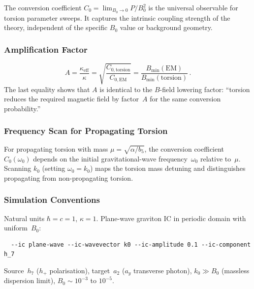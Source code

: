 The conversion coefficient $C_0 = \lim_{B_0 \to 0} P/B_0^2$ is the
universal observable for torsion parameter sweeps.  It captures the
intrinsic coupling strength of the theory, independent of the specific
$B_0$ value or background geometry.

\subsubsection{Amplification Factor}

\begin{equation}
  A = \frac{\kappa_\mathrm{eff}}{\kappa}
    = \sqrt{\frac{C_{0,\text{torsion}}}{C_{0,\text{EM}}}}
    = \frac{B_\mathrm{min}(\text{EM})}{B_\mathrm{min}(\text{torsion})}\,.
  \label{eq:bv-amplification}
\end{equation}
The last equality shows that $A$ is identical to the $B$-field lowering
factor: ``torsion reduces the required magnetic field by factor~$A$ for
the same conversion probability.''

\subsubsection{Frequency Scan for Propagating Torsion}

For propagating torsion with mass $\mu = \sqrt{\alpha/b_5}$, the
conversion coefficient $C_0(\omega_0)$ depends on the initial
gravitational-wave frequency~$\omega_0$ relative to~$\mu$.  Scanning
$k_0$ (setting $\omega_0 = k_0$) maps the torsion mass detuning and
distinguishes propagating from non-propagating torsion.

\subsubsection{Simulation Conventions}

Natural units $\hbar = c = 1$, $\kappa = 1$.  Plane-wave graviton IC
in periodic domain with uniform~$B_0$:
\begin{verbatim}
  --ic plane-wave --ic-wavevector k0 --ic-amplitude 0.1 --ic-component h_7
\end{verbatim}
Source~$h_7$ ($h_+$ polarisation), target~$a_2$ ($a_y$ transverse photon),
$k_0 \gg B_0$ (massless dispersion limit), $B_0 \sim 10^{-3}$ to $10^{-5}$.
